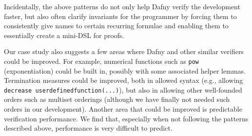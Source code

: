 \documentclass[12pt]{report}
\begin{document}
Incidentally, the above patterns do not only help Dafny verify the
development faster, but also often clarify invariants for the
programmer by forcing them to consistently give names to certain
recurring formulae and enabling them to essentially create a mini-DSL
for proofs.

Our case study also suggests a few areas where Dafny and other similar
verifiers could be improved. For example, numerical functions such as
\texttt{pow} (exponentiation) could be built in, possibly with some
associated helper lemmas. Termination measures could be improved, both
in allowed syntax (e.g., allowing \texttt{decrease
  userdefinedfunction(...)}), but also in allowing other well-founded
orders such as multiset orderings (although we have finally not needed
such orders in our development). Another area that could be improved
is predictable verification performance. We find that, especially when
not following the patterns described above, performance is very
difficult to predict.%






\end{document}
